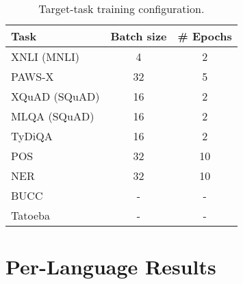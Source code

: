 \documentclass[11pt,a4paper]{article}
\begin{document}
\begin{table}[ht!]
\centering\small
\begin{tabular}{lcc}
\toprule
Task & Batch size & \# Epochs \\
\midrule
XNLI (MNLI) & 4 & 2 \\
PAWS-X & 32 & 5 \\
XQuAD (SQuAD) & 16 & 2 \\
MLQA (SQuAD) & 16 & 2 \\
TyDiQA & 16 & 2 \\
POS & 32 & 10 \\
NER & 32 & 10 \\
BUCC & - & - \\
Tatoeba & - & - \\
\bottomrule
\end{tabular}
\caption{Target-task training configuration.}
\label{tab:appendix_xtreme_hyperparameters}
\end{table}

\section{Per-Language Results}\label{appendix:B}
\end{document}
